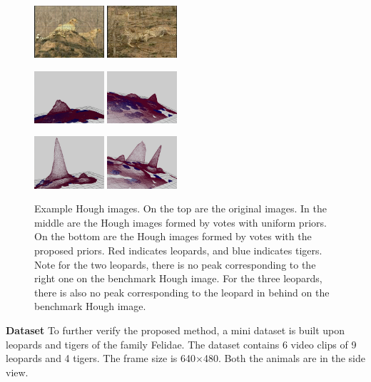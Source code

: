 \documentclass[10pt,twocolumn,letterpaper]{article}
\begin{document}
\begin{figure}
\centering


\includegraphics[width=0.23\textwidth,bb=0 0 640 480]{PER1.jpg}
\includegraphics[width=0.23\textwidth,bb=0 0 640 480]{PER2.jpg}

\includegraphics[width=0.23\textwidth,bb=0 0 640 480]{1.jpg}
\includegraphics[width=0.23\textwidth,bb=0 0 640 480]{3.jpg}

\includegraphics[width=0.23\textwidth,bb=0 0 640 480]{2.jpg}
\includegraphics[width=0.23\textwidth,bb=0 0 640 480]{4.jpg}


\caption{Example Hough images. On the top are the original images. In the middle are the Hough images formed by votes with uniform priors. On the bottom are the Hough images formed by votes with the proposed priors. Red indicates leopards, and blue indicates tigers. Note for the two leopards, there is no peak corresponding to the right one on the benchmark Hough image. For the three leopards, there is also no peak corresponding to the leopard in behind on the benchmark Hough image.}
\label{fig:BcHi}
\end{figure}
\textbf{Dataset} To further verify the proposed method, a mini dataset is built upon leopards and tigers of the family Felidae. The dataset contains 6 video clips of 9 leopards and 4 tigers. The frame size is 640$\times$480. Both the animals are in the side view.
\end{document}
